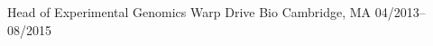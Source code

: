 \begin{cventries}
\cventry
{Head of Experimental Genomics}
{Warp Drive Bio}
{Cambridge, MA}
{04/2013--08/2015}
{
}

\vspace{-0.4cm}


\end{cventries}
